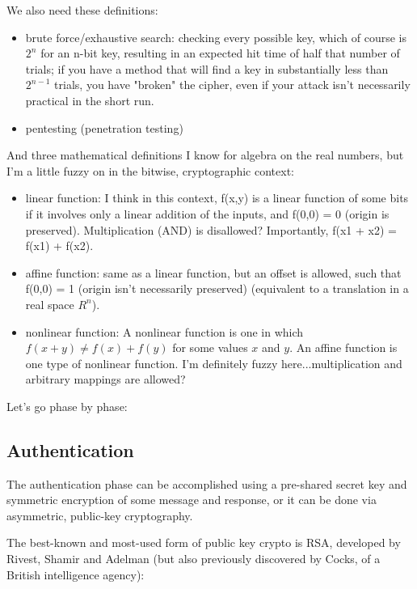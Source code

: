 \documentclass[%
 aip,
 jmp,%
 amsmath,amssymb,
 reprint,%
]{revtex4-1}
\begin{document}
We also need these definitions:

\begin{itemize}
\item brute force/exhaustive search: checking every possible key, which of
  course is $2^n$ for an n-bit key, resulting in an expected hit time of
  half that number of trials; if you have a method that will find a
  key in substantially less than $2^{n-1}$ trials, you have "broken" the
  cipher, even if your attack isn't necessarily practical in the short
  run.
\item pentesting (penetration testing)
\end{itemize}

And three mathematical definitions I know for algebra on the real
numbers, but I'm a little fuzzy on in the bitwise, cryptographic
context:

\begin{itemize}
\item linear function: I think in this context, f(x,y) is a linear
  function of some bits if it involves only a linear addition of
  the inputs, and f(0,0) = 0 (origin is preserved).  Multiplication
  (AND) is disallowed?  Importantly, f(x1 + x2) = f(x1) + f(x2).
\item affine function: same as a linear function, but an offset is
  allowed, such that f(0,0) = 1 (origin isn't necessarily preserved)
  (equivalent to a translation in a real space $R^n$).
\item nonlinear function: A nonlinear function is one in which $f(x+y) \ne f(x) + f(y)$ for some values $x$ and $y$. An affine function is one type of nonlinear function. I'm definitely fuzzy here...multiplication and
  arbitrary mappings are allowed?
\end{itemize}

Let's go phase by phase:

\subsection{Authentication}

The authentication phase can be accomplished using a pre-shared secret
key and symmetric encryption of some message and response, or it can
be done via asymmetric, public-key cryptography.

The best-known and most-used form of public key crypto is RSA, developed by Rivest, Shamir and Adelman (but also previously discovered by Cocks, of a British intelligence agency):
\end{document}
